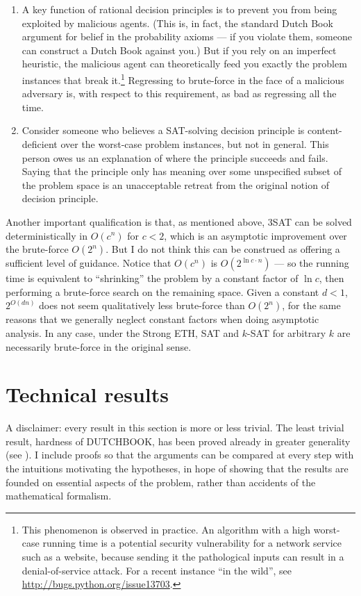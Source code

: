\documentclass[letterpaper,12pt]{article}
\begin{document}
\begin{enumerate}
\item
A key function of rational decision principles is to prevent you from being exploited by malicious agents. (This is, in fact, the standard Dutch Book argument for belief in the probability axioms --- if you violate them, someone can construct a Dutch Book against you.) But if you rely on an imperfect heuristic, the malicious agent can theoretically feed you exactly the problem instances that break it.\footnote{This phenomenon is observed in practice. An algorithm with a high worst-case running time is a potential security vulnerability for a network service such as a website, because sending it the pathological inputs can result in a denial-of-service attack. For a recent instance ``in the wild'', see \url{http://bugs.python.org/issue13703}.} Regressing to brute-force in the face of a malicious adversary is, with respect to this requirement, as bad as regressing all the time.
\item
Consider someone who believes a SAT-solving decision principle is content-deficient over the worst-case problem instances, but not in general. This person owes us an explanation of where the principle succeeds and fails. Saying that the principle only has meaning over some unspecified subset of the problem space is an unacceptable retreat from the original notion of decision principle.
\end{enumerate}

Another important qualification is that, as mentioned above, 3SAT can be solved deterministically in $O(c^n)$ for $c < 2$, which is an asymptotic improvement over the brute-force $O(2^n)$. But I do not think this can be construed as offering a sufficient level of guidance. Notice that $O(c^n)$ is $O(2^{\ln c \cdot n})$ --- so the running time is equivalent to ``shrinking'' the problem by a constant factor of $\ln c$, then performing a brute-force search on the remaining space. Given a constant $d < 1$, $2^{O(dn)}$ does not seem qualitatively less brute-force than $O(2^n)$, for the same reasons that we generally neglect constant factors when doing asymptotic analysis. In any case, under the Strong ETH, SAT and $k$-SAT for arbitrary $k$ are necessarily brute-force in the original sense.

\section{Technical results}
A disclaimer: every result in this section is more or less trivial. The least trivial result, hardness of DUTCHBOOK, has been proved already in greater generality (see \cite{paris1994uncertain}). I include proofs so that the arguments can be compared at every step with the intuitions motivating the hypotheses, in hope of showing that the results are founded on essential aspects of the problem, rather than accidents of the mathematical formalism.
\end{document}
